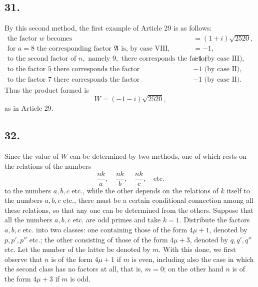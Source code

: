 \documentclass[12pt]{article}
\begin{document}
\subsection*{31.}

By this second method, the first example of Article 29 is as follows:
\[
\begin{array}{ll}
\text{the factor }w\text{ becomes} & =(1+i)\sqrt{2520},\\
\text{for }a=8\text{ the corresponding factor }\mathfrak A\text{ is, by case VIII,} & =-1,\\
\text{to the second factor of }n,\text{ namely }9,\text{ there corresponds the factor} & +1\text{ (by case III)},\\
\text{to the factor }5\text{ there corresponds the factor} & -1\text{ (by case II)},\\
\text{to the factor }7\text{ there corresponds the factor} & -1\text{ (by case II)}.
\end{array}
\]
Thus the product formed is
\[
W=(-1-i)\sqrt{2520},
\]
as in Article 29.

\subsection*{32.}

Since the value of $W$ can be determined by two methods, one of which rests on the relations of the numbers
\[
\frac{nk}{a},\quad \frac{nk}{b},\quad \frac{nk}{c},\quad\text{etc.}
\]
to the numbers $a,b,c$ etc., while the other depends on the relations of $k$ itself to the numbers $a,b,c$ etc., there must be a certain conditional connection among all these relations, so that any one can be determined from the others. Suppose that all the numbers $a,b,c$ etc. are odd primes and take $k=1$. Distribute the factors $a,b,c$ etc. into two classes: one containing those of the form $4\mu+1$, denoted by $p,p',p''$ etc.; the other consisting of those of the form $4\mu+3$, denoted by $q,q',q''$ etc. Let the number of the latter be denoted by $m$. With this done, we first observe that $n$ is of the form $4\mu+1$ if $m$ is even, including also the case in which the second class has no factors at all, that is, $m=0$; on the other hand $n$ is of the form $4\mu+3$ if $m$ is odd.
\end{document}
